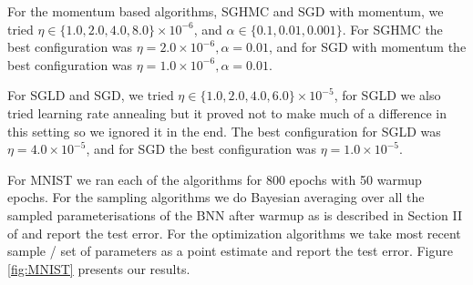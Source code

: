 For the momentum based algorithms, SGHMC and SGD with momentum, we tried $\eta \in \{1.0, 2.0, 4.0, 8.0 \} \times 10^{-6}$, and $\alpha \in \{0.1, 0.01, 0.001 \}$. For SGHMC the best configuration was $\eta = 2.0\times 10^{-6}, \alpha=0.01$, and for SGD with momentum the best configuration was $\eta = 1.0\times 10^{-6}, \alpha=0.01$.

For SGLD and SGD, we tried $\eta \in \{1.0, 2.0, 4.0, 6.0\} \times 10^{-5}$, for SGLD we also tried learning rate annealing but it proved not to make much of a difference in this setting so we ignored it in the end. The best configuration for SGLD was $\eta = 4.0\times 10^{-5}$, and for SGD the best configuration was $\eta = 1.0\times 10^{-5}$.

For MNIST we ran each of the algorithms for 800 epochs with 50 warmup epochs. For the sampling algorithms we do Bayesian averaging over all the sampled parameterisations of the BNN after warmup as is described in Section II of \cite{hands-on-bnn} and report the test error. For the optimization algorithms we take most recent sample / set of parameters as a point estimate and report the test error.  Figure \ref{fig:MNIST} presents our results.

